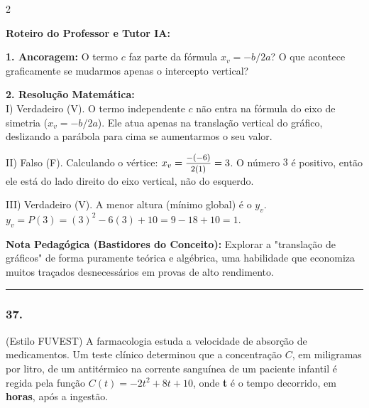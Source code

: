 \begin{multicols*}{2}
\ifgabarito
    \begin{tcolorbox}[colback=CorTitUm!5, colframe=CorTitUm, boxrule=1pt, arc=4pt, left=6pt, right=6pt, top=6pt, bottom=6pt]
    \small\textbf{\textcolor{CorTitUm}{Roteiro do Professor e Tutor IA:}}\par\vspace{0.1cm}
    \color{CinzaEscuro}
    \textbf{1. Ancoragem:} O termo $c$ faz parte da fórmula $x_v = -b/2a$? O que acontece graficamente se mudarmos apenas o intercepto vertical?\par\vspace{0.1cm}
    \textbf{2. Resolução Matemática:}\\
    I) Verdadeiro (V). O termo independente $c$ não entra na fórmula do eixo de simetria ($x_v = -b/2a$). Ele atua apenas na translação vertical do gráfico, deslizando a parábola para cima se aumentarmos o seu valor.
    
    II) Falso (F). Calculando o vértice: $x_v = \mfrac{-(-6)}{2(1)} = 3$. O número $3$ é positivo, então ele está do lado direito do eixo vertical, não do esquerdo.
    
    III) Verdadeiro (V). A menor altura (mínimo global) é o $y_v$.
    $y_v = P(3) = (3)^2 - 6(3) + 10 = 9 - 18 + 10 = 1$.
    \end{tcolorbox}
    \vspace{0.15cm}
    
    \begin{boxexplicacao}
    \textbf{Nota Pedagógica (Bastidores do Conceito):} Explorar a "translação de gráficos" de forma puramente teórica e algébrica, uma habilidade que economiza muitos traçados desnecessários em provas de alto rendimento.
    \end{boxexplicacao}
\fi

\par\vspace{\espacoQuestao}

\noindent\textcolor{CorLinha}{\rule{\linewidth}{0.5pt}} 
\par\vspace{\espacoPreQuestao}
\subsubsection*{37.} 
\begin{enunciadoLiteral}
(Estilo FUVEST) A farmacologia estuda a velocidade de absorção de medicamentos. Um teste clínico determinou que a concentração $C$, em miligramas por litro, de um antitérmico na corrente sanguínea de um paciente infantil é regida pela função $C(t) = -2t^2 + 8t + 10$, onde \textbf{t} é o tempo decorrido, em \textbf{horas}, após a ingestão.


\end{enunciadoLiteral}
\end{multicols*}
